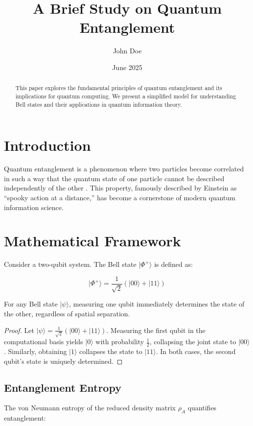 \documentclass{article}
\title{A Brief Study on Quantum Entanglement}
\author{John Doe}
\date{June 2025}
\begin{document}
\maketitle

\begin{abstract}
This paper explores the fundamental principles of quantum entanglement and its implications for quantum computing. We present a simplified model for understanding Bell states and their applications in quantum information theory.
\end{abstract}

\section{Introduction}
Quantum entanglement is a phenomenon where two particles become correlated in such a way that the quantum state of one particle cannot be described independently of the other \cite{einstein1935}. This property, famously described by Einstein as ``spooky action at a distance,'' has become a cornerstone of modern quantum information science.

\section{Mathematical Framework}
Consider a two-qubit system. The Bell state $|\Phi^+\rangle$ is defined as:

$$|\Phi^+\rangle = \frac{1}{\sqrt{2}}(|00\rangle + |11\rangle)$$

\begin{theorem}
For any Bell state $|\psi\rangle$, measuring one qubit immediately determines the state of the other, regardless of spatial separation.
\end{theorem}

\begin{proof}
Let $|\psi\rangle = \frac{1}{\sqrt{2}}(|00\rangle + |11\rangle)$. Measuring the first qubit in the computational basis yields $|0\rangle$ with probability $\frac{1}{2}$, collapsing the joint state to $|00\rangle$. Similarly, obtaining $|1\rangle$ collapses the state to $|11\rangle$. In both cases, the second qubit's state is uniquely determined.
\end{proof}

\subsection{Entanglement Entropy}
The von Neumann entropy of the reduced density matrix $\rho_A$ quantifies entanglement:
\end{document}
